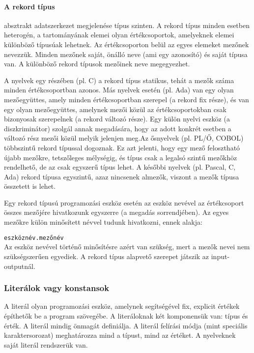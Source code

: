 \paragraph{A rekord típus} absztrakt adatszerkezet megjelenése típus szinten. A rekord típus minden esetben heterogén, a tartományának elemei olyan értékcsoportok, amelyeknek elemei különböző típusúak lehetnek. Az értékcsoporton belül az egyes elemeket mezőnek nevezzük. Minden mezőnek saját, önálló neve (ami egy azonosító) és saját típusa van. A különböző rekord típusok mezőinek neve megegyezhet.

A nyelvek egy részében (pl. C) a rekord típus statikus, tehát a mezők száma minden értékcsoportban azonos. Más nyelvek esetén (pl. Ada) van egy olyan mezőegyüttes, amely minden értékcsoportban szerepel (a rekord fix része), és van egy olyan mezőegyüttes, amelynek mezői közül az értékcsoportokban csak bizonyosak szerepelnek (a rekord változó része). Egy külön nyelvi eszköz (a diszkriminátor) szolgál annak megadására, hogy az adott konkrét esetben a változó rész mezői közül melyik jelenjen meg.Az ősnyelvek (pl. PL/Ő, COBOL) többszintű rekord típussal dogoznak. Ez azt jelenti, hogy egy mező felosztható újabb mezőkre, tetszőleges mélységig, és típus csak a legalsó szintű mezőkhöz rendelhető, de az csak egyszerű típus lehet. A későbbi nyelvek (pl. Pascal, C, Ada) rekord típusa egyszintű, azaz nincsenek almezők, viszont a mezők típusa összetett is lehet.

Egy rekord típusú programozási eszköz esetén az eszköz nevével az értékcsoport összes mezőjére hivatkozunk egyszerre (a megadás sorrendjében). Az egyes mezőkre külön minősített névvel tudunk hivatkozni, ennek alakja:

{
\centering
\verb|eszköznév.mezőnév|\\
}
Az eszköz nevével történő minősítésre azért van szükség, mert a mezők nevei nem szükségszerűen egyediek. A rekord típus alapvető szerepet játszik az input-outputnál.
\subsubsection{Literálok vagy konstansok}
A literál olyan programozási eszköz, amelynek segítségével fix, explicit értékek építhetők be a program szövegébe. A literáloknak két komponensük van: típus és érték. A literál mindig önmagát definiálja. A literál felírási módja (mint speciális karaktersorozat) meghatározza mind a típust, mind az értéket. A nyelveknek saját literál rendszerük van.
